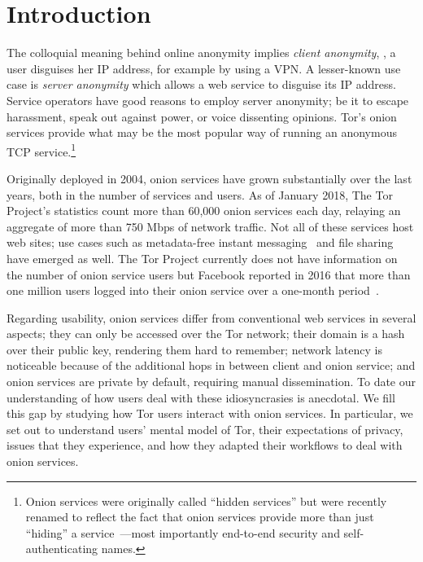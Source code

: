 \section{Introduction}
\label{sec:introduction}

The colloquial meaning behind online anonymity implies \emph{client anonymity},
\ie, a user disguises her IP address, for example by using a VPN.  A
lesser-known use case is \emph{server anonymity} which allows a web service to
disguise its IP address.  Service operators have good reasons to employ server
anonymity; be it to escape harassment, speak out against power, or voice
dissenting opinions.  Tor's onion services provide what may be the most popular
way of running an anonymous TCP service.\footnote{Onion services were originally
called ``hidden services'' but were recently renamed to reflect the fact that
onion services provide more than just ``hiding'' a
service~\cite{Johnson2015a}---most importantly end-to-end security and
self-authenticating names.}

Originally deployed in 2004, onion services have grown substantially over the
last years, both in the number of services and users.  As of January 2018, The
Tor Project's statistics count more than 60,000 onion services each day,
relaying an aggregate of more than 750 Mbps of network traffic.  Not all of
these services host web sites; use cases such as metadata-free instant
messaging~\cite{ricochet} and file sharing~\cite{onionshare} have emerged as
well.  The Tor Project currently does not have information on the number of
onion service users but Facebook reported in 2016 that more than one million
users logged into their onion service over a one-month
period~\cite{facebook-users}.

Regarding usability, onion services differ from conventional web services in
several aspects; \first they can only be accessed over the Tor network; \second
their domain is a hash over their public key, rendering them hard to remember;
\third network latency is noticeable because of the additional hops in between
client and onion service; and \fourth onion services are private by default,
requiring manual dissemination.  To date our understanding of how users deal
with these idiosyncrasies is anecdotal.  We fill this gap by studying how Tor
users interact with onion services.  In particular, we set out to understand
users' mental model of Tor, their expectations of privacy, issues that they
experience, and how they adapted their workflows to deal with onion services.

